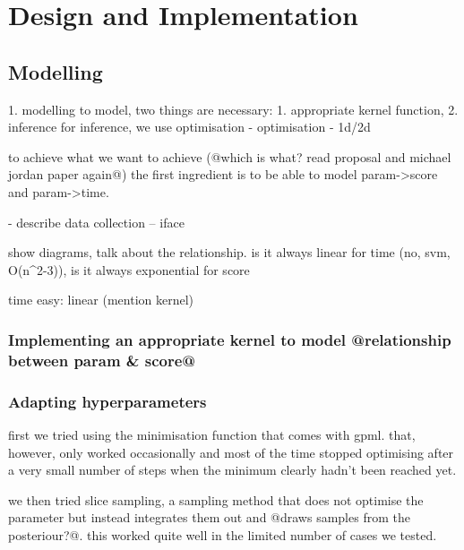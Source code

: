 \documentclass[a4paper,12pt,twoside,openright]{report}
\begin{document}




\chapter{Design and Implementation} 

\section{Modelling}
1. modelling
to model, two things are necessary: 1. appropriate kernel function, 2. inference
for inference, we use optimisation
- optimisation
- 1d/2d

to achieve what we want to achieve (@which is what? read proposal and michael jordan paper again@) the first ingredient is to be able to model param->score and param->time.

- describe data collection
-- iface

show diagrams, talk about the relationship. is it always linear for time (no, svm, O(n^2-3)), is it always exponential for score

time easy: linear (mention kernel)

\subsection{Implementing an appropriate kernel to model @relationship between param & score@}
\subsection{Adapting hyperparameters}


first we tried using the minimisation function that comes with gpml. that, however, only worked occasionally and most of the time stopped optimising after a very small number of steps when the minimum clearly hadn't been reached yet.


we then tried slice sampling, a sampling method that does not optimise the parameter but instead integrates them out and @draws samples from the posteriour?@. this worked quite well in the limited number of cases we tested.
\end{document}
